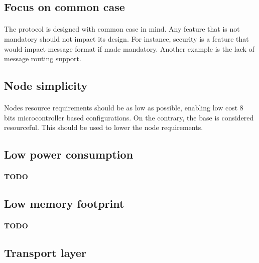 \documentclass[a4paper, 11pt]{article}
\begin{document}
\subsection{Focus on common case}
\paragraph{}
The protocol is designed with common case in mind. Any feature that is not
mandatory should not impact its design. For instance, security is a feature
that would impact message format if made mandatory. Another example is the
lack of message routing support.

\subsection{Node simplicity}
\paragraph{}
Nodes resource requirements should be as low as possible, enabling low cost
8 bits microcontroller based configurations. On the contrary, the base is
considered resourceful. This should be used to lower the node requirements.

\subsection{Low power consumption}
\paragraph{}
\textbf{TODO}

\subsection{Low memory footprint}
\paragraph{}
\textbf{TODO}


\subsection{Transport layer}
\end{document}
